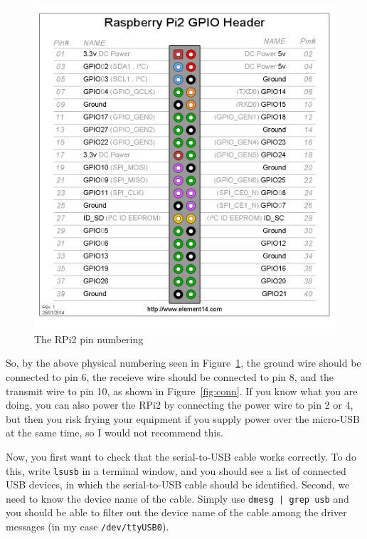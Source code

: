 \documentclass[a4paper,11pt,reqno]{amsart}
\begin{document}
\begin{figure}[hb]
\begin{center}
   \includegraphics[scale=0.3]{GPIO_Pi2.png}
 \end{center}
 \caption{The RPi2 pin numbering~\cite{pinout}}
 \label{fig:pins}
\end{figure}

So, by the above physical numbering seen in Figure~\ref{fig:pins}, the ground wire should be connected to pin 6, the receieve wire should be connected to pin 8, and the transmit wire to pin 10, as shown in Figure~\ref{fig:conn}. If you know what you are doing, you can also power the RPi2 by connecting the power wire to pin 2 or 4, but then you risk frying your equipment if you supply power over the micro-USB at the same time, so I would not recommend this.

Now, you first want to check that the serial-to-USB cable works correctly. To do this, write \texttt{lsusb} in a terminal window, and you should see a list of connected USB devices, in which the serial-to-USB cable should be identified. Second, we need to know the device name of the cable. Simply use \texttt{dmesg | grep usb} and you should be able to filter out the device name of the cable among the driver messages (in my case \texttt{/dev/ttyUSB0}).
\end{document}
